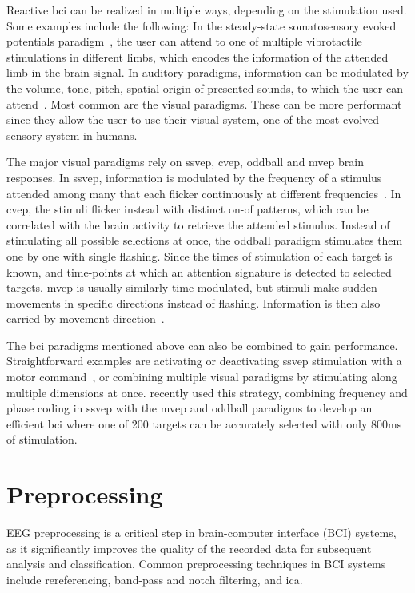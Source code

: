 Reactive \ac{bci} can be realized in multiple ways, depending on the
stimulation used.
Some examples include the following:
In the steady-state somatosensory evoked potentials paradigm~\cite{Petit2021},
the user can attend to one of multiple vibrotactile stimulations in different
limbs, which encodes the information of the attended limb in the brain signal.
In auditory paradigms, information can be modulated by the volume, tone, pitch,
spatial origin of presented sounds, to which the user can
attend~\cite{Kaongoen2017}.
Most common are the visual paradigms.
These can be more performant since they allow the user to use their visual
system, one of the most evolved sensory system in humans.

The major visual paradigms rely on
\ac{ssvep}, \ac{cvep}, oddball and \ac{mvep} brain responses.
In \ac{ssvep}, information is modulated by the frequency of a stimulus attended
among many that each flicker continuously at different
frequencies~\cite{Chen2021}.
In \ac{cvep}, the stimuli flicker instead with distinct on-of patterns, which can
be correlated with the brain activity to retrieve the attended stimulus.
Instead of stimulating all possible selections at once, the oddball paradigm
stimulates them one by one with single flashing.
Since the times of stimulation of each target is known, and time-points at
which an attention signature is detected to selected targets.
\Ac{mvep} is usually similarly time modulated, but stimuli make sudden
movements in specific directions instead of flashing.
Information is then also carried by movement
direction~\cite{Libert2021a,Libert2022}.

The \ac{bci} paradigms mentioned above can also be combined to gain performance.
Straightforward examples are activating or deactivating \ac{ssvep} stimulation
with a motor command~\cite{Neeling2019}, or combining multiple visual paradigms by stimulating
along multiple dimensions at once.
\textcite{Han2023} recently used this strategy, combining frequency and phase
coding in \ac{ssvep} with the \ac{mvep} and oddball paradigms to develop an
efficient \ac{bci} where one of 200 targets can be accurately selected with
only 800ms of stimulation.

\section{Preprocessing}%
\label{sec:bci/preprocessing}
EEG preprocessing is a critical step in brain-computer interface (BCI) systems, as it
significantly improves the quality of the recorded data for subsequent analysis and
classification. Common preprocessing techniques in BCI systems include
rereferencing, band-pass and notch filtering, and \ac{ica}.

